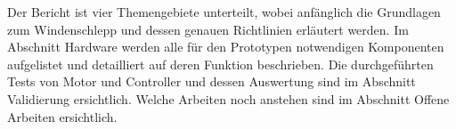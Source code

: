 Der Bericht ist vier Themengebiete unterteilt, wobei anfänglich die Grundlagen zum Windenschlepp und dessen genauen Richtlinien erläutert werden. Im Abschnitt Hardware werden alle für den Prototypen notwendigen Komponenten aufgelistet und detailliert auf deren Funktion beschrieben. Die durchgeführten Tests von Motor und Controller und dessen Auswertung sind im Abschnitt Validierung ersichtlich. Welche Arbeiten noch anstehen sind im Abschnitt Offene Arbeiten ersichtlich.   

